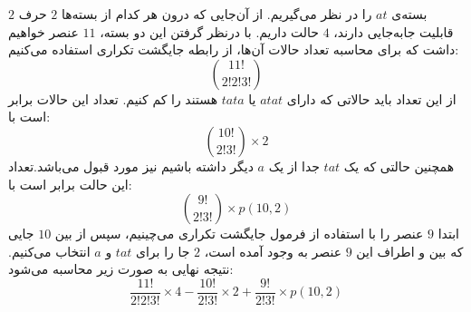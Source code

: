 \p 
$2$ 
بسته‌ی
$at$
را در نظر می‌گیریم. از آن‌جایی که درون هر کدام از بسته‌ها
$2$ 
  حرف قابلیت جابه‌جایی دارند،
$4$ 
  حالت داریم. با درنظر گرفتن این دو بسته،
$11$ 
  عنصر خواهیم داشت که برای محاسبه تعداد حالات آن‌ها، از رابطه جایگشت تکراری استفاده می‌کنیم:
$$\binom{11!}{2!2!3!}$$ 
\p
  از این تعداد باید حالاتی که دارای
$atat$
   یا 
$tata$
   هستند را کم کنیم. تعداد این حالات برابر است با:
$$\binom{10!}{2!3!}\times2$$
\p
  همچنین حالتی که یک
$tat$
     جدا از یک 
$a$
      دیگر داشته باشیم نیز مورد قبول می‌باشد.تعداد این حالت برابر است با: 
      $$\binom{9!}{2!3!} \times {p(10,2)}$$
	\p
       ابتدا 
$9$ 
       عنصر را با استفاده از فرمول جایگشت تکراری می‌چینیم، سپس از بین 
$10$ 
      جایی که بین و اطراف این 
$9$ 
      عنصر به وجود آمده است،
$2$ 
      جا را برای
$tat$
      و
$a$ 
      انتخاب می‌کنیم.
       نتیجه نهایی به صورت زیر محاسبه می‌شود:
    \[\frac{11!}{2!2!3!}\times4 - \frac{10!}{2!3!}\times2 + {\frac{9!}{2!3!}}\times{p(10,2)}\]